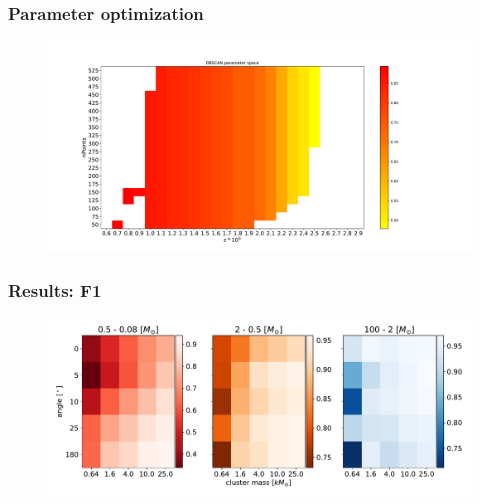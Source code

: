 \documentclass{beamer}
\begin{document}
\begin{frame}
\frametitle{Parameter optimization}
\begin{figure}
\centering
\includegraphics[width=\textwidth,height=\textheight,keepaspectratio]{Images/DBSCAN_parameter_space.pdf}
\end{figure}

\end{frame}


\begin{frame}
\frametitle{Results: F1}
\begin{figure}
\centering
\includegraphics[width=\textwidth,height=\textheight,keepaspectratio]{Images/25_F1.pdf}
\end{figure}

\end{frame}
\end{document}
